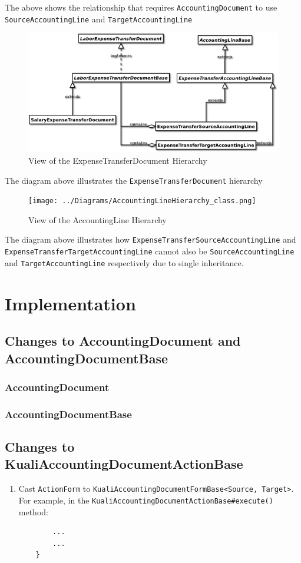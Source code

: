 \documentclass[12pt,notitlepage]{article}
\begin{document}
  The above shows the relationship that requires \verb|AccountingDocument| to use \verb|SourceAccountingLine|
  and \verb|TargetAccountingLine|
  \newpage
  \begin{figure}[!h]
    \caption{View of the ExpenseTransferDocument Hierarchy}
    \includegraphics[bb=25 250 400 450]{../Diagrams/ExpenseTransferDocumentHierarchy_class.png}
  \end{figure}
  The diagram above illustrates the \verb|ExpenseTransferDocument| hierarchy

  \begin{figure}[!h]
    \caption{View of the AccountingLine Hierarchy}
    \texttt{[image: ../Diagrams/AccountingLineHierarchy\_class.png]}
  \end{figure}
  The diagram above illustrates how \verb|ExpenseTransferSourceAccountingLine| and \verb|ExpenseTransferTargetAccountingLine|
  cannot also be \verb|SourceAccountingLine| and \verb|TargetAccountingLine| respectively due to single inheritance.

  \section{Implementation}
  \subsection{Changes to AccountingDocument and AccountingDocumentBase}
  \subsubsection{AccountingDocument}
  \subsubsection{AccountingDocumentBase}
  \subsection{Changes to KualiAccountingDocumentActionBase}
  \begin{enumerate}
    \item Cast \verb|ActionForm| to \verb|KualiAccountingDocumentFormBase<Source, Target>|. For example, in the \verb|KualiAccountingDocumentActionBase#execute()| method:
      
      \begin{lstlisting}
        ...
        ...
    }
      \end{lstlisting}
  \end{enumerate}
\end{document}
